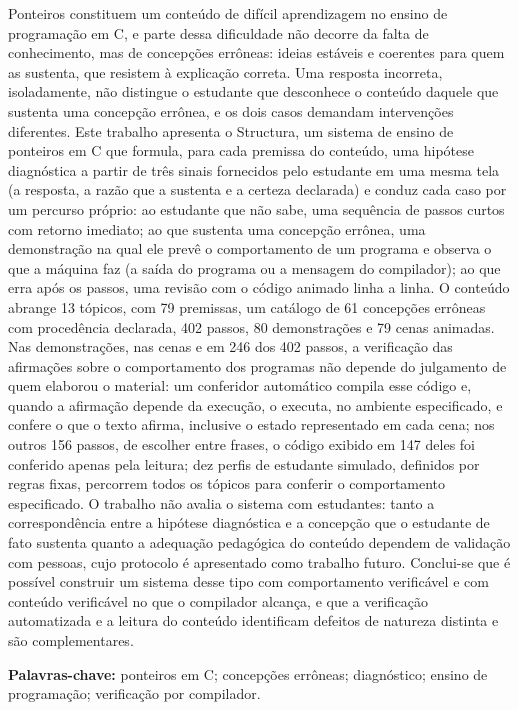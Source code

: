 
Ponteiros constituem um conteúdo de difícil aprendizagem no ensino de programação em C, e parte dessa dificuldade não decorre da falta de conhecimento, mas de concepções errôneas: ideias estáveis e coerentes para quem as sustenta, que resistem à explicação correta. Uma resposta incorreta, isoladamente, não distingue o estudante que desconhece o conteúdo daquele que sustenta uma concepção errônea, e os dois casos demandam intervenções diferentes. Este trabalho apresenta o Structura, um sistema de ensino de ponteiros em C que formula, para cada premissa do conteúdo, uma hipótese diagnóstica a partir de três sinais fornecidos pelo estudante em uma mesma tela (a resposta, a razão que a sustenta e a certeza declarada) e conduz cada caso por um percurso próprio: ao estudante que não sabe, uma sequência de passos curtos com retorno imediato; ao que sustenta uma concepção errônea, uma demonstração na qual ele prevê o comportamento de um programa e observa o que a máquina faz (a saída do programa ou a mensagem do compilador); ao que erra após os passos, uma revisão com o código animado linha a linha. O conteúdo abrange 13 tópicos, com 79 premissas, um catálogo de 61 concepções errôneas com procedência declarada, 402 passos, 80 demonstrações e 79 cenas animadas. Nas demonstrações, nas cenas e em 246 dos 402 passos, a verificação das afirmações sobre o comportamento dos programas não depende do julgamento de quem elaborou o material: um conferidor automático compila esse código e, quando a afirmação depende da execução, o executa, no ambiente especificado, e confere o que o texto afirma, inclusive o estado representado em cada cena; nos outros 156 passos, de escolher entre frases, o código exibido em 147 deles foi conferido apenas pela leitura; dez perfis de estudante simulado, definidos por regras fixas, percorrem todos os tópicos para conferir o comportamento especificado. O trabalho não avalia o sistema com estudantes: tanto a correspondência entre a hipótese diagnóstica e a concepção que o estudante de fato sustenta quanto a adequação pedagógica do conteúdo dependem de validação com pessoas, cujo protocolo é apresentado como trabalho futuro. Conclui-se que é possível construir um sistema desse tipo com comportamento verificável e com conteúdo verificável no que o compilador alcança, e que a verificação automatizada e a leitura do conteúdo identificam defeitos de natureza distinta e são complementares.

\vspace{\onelineskip}
\noindent
\textbf{Palavras-chave:} ponteiros em C; concepções errôneas; diagnóstico; ensino de programação; verificação por compilador.
